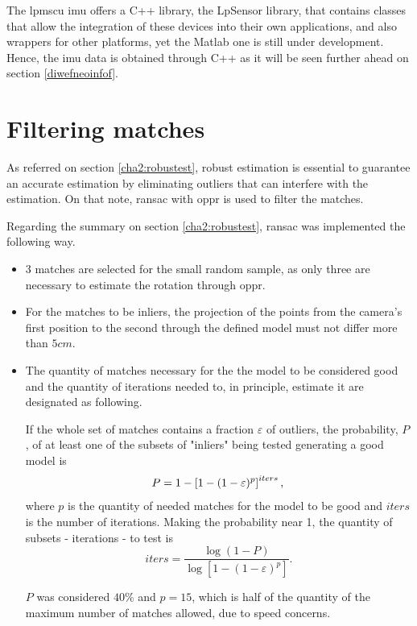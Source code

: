 The \acrshort{lpmscu} \acrshort{imu} offers a C++ library, the LpSensor library, that contains classes that allow the integration of these devices into their own applications, and also wrappers for other platforms, yet the Matlab one is still under development. Hence, the \acrshort{imu} data is obtained through C++ as it will be seen further ahead on section \ref{diwefneoinfof}.

\section{Filtering matches}

As referred on section \ref{cha2:robustest}, robust estimation is essential to guarantee an accurate estimation by eliminating outliers that can interfere with the estimation. On that note, \acrshort{ransac} with \acrshort{oppr} is used to filter the matches.

Regarding the summary on section \ref{cha2:robustest}, \acrshort{ransac} was implemented the following way.

\begin{itemize}
	\item 3 matches are selected for the small random sample, as only three are necessary to estimate the rotation through \acrshort{oppr}.
	\item For the matches to be inliers, the projection of the points from the camera's first position to the second through the defined model must not differ more than $5 cm$.
	\item The quantity of matches necessary for the the model to be considered good and the quantity of iterations needed to, in principle, estimate it are designated as following.
	
	If the whole set of matches contains a fraction $\varepsilon$ of outliers, the probability, $P$, of at least one of the subsets of "inliers" being tested generating a good model is 
	\begin{equation}
	P=1-\left[1-(1-\varepsilon)^{p}\right]^{iters},\\
	\end{equation}
	where $p$ is the quantity of needed matches for the model to be good and $iters$ is the number of iterations. \cite{detep}
	Making the probability near 1, the quantity of subsets - iterations - to test is
	\begin{equation}
	iters = \frac{\log (1-P)}{\log \left[1-(1-\varepsilon)^{p}\right]}.
	\end{equation}
	
	$P$ was considered $40\%$ and $p = 15$, which is half of the quantity of the maximum number of matches allowed, due to speed concerns. 
\end{itemize}


